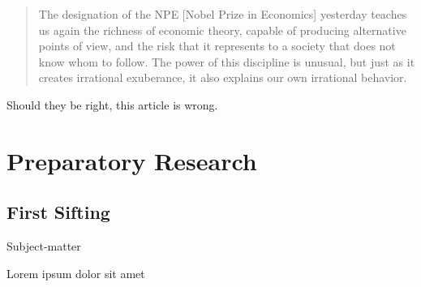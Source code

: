 \documentclass[draft=false, paper=A4,portrait,twoside=true,twocolumn=false,headinclude=false,footinclude=false,fontsize=11,BCOR=15mm,DIV=calc,pagesize=auto,titlepage=firstiscover,mpinclude=true,headings=big,headings=twolinechapter,open=right,chapterprefix=false,headsepline=false,parskip=full]{scrbook}
\begin{document}
\blockcquote{Alvarez2013}{The designation of the NPE [Nobel Prize in Economics] yesterday teaches us again the richness of economic theory, capable of producing  alternative points of view, and the risk that it represents to a society that does not know whom to follow. The power of this discipline is unusual, but just as it creates irrational exuberance, it also explains our own irrational behavior.}

Should they be right, this article is wrong. 

\mainmatter
\pagestyle{scrheadings}
\part{Preparatory Research}
\label{sec:orgd226ba9}
\chapter{First Sifting}
\label{sec:org45c564c}
   \begin{labeling}[~]{Subject-matter} 
\item[Subject-matter] Lorem ipsum dolor sit amet
\end{labeling}
\end{document}
